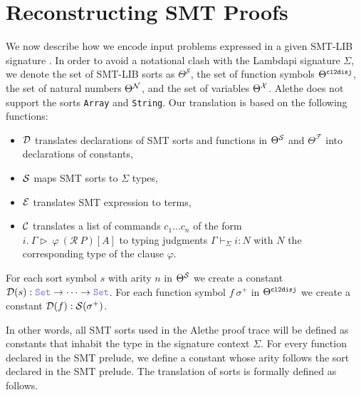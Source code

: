\chapter{Reconstructing SMT Proofs}\label{ch:reconstruction}

We now describe how we encode input problems expressed in a given
SMT-LIB signature \cite[\S 5.2.1]{smtlib}. In order to avoid a notational clash with the Lambdapi signature $\Sigma$, we denote the set of SMT-LIB sorts as $\Theta^\mathcal{S}$, the set of function symbols $\Theta^\cltodisj$, the set of natural numbers $\Theta^\cal{N}$, and the set of variables $\Theta^\cal{X}$.
Alethe does not support the sorts \texttt{Array} and \texttt{String}. Our translation is based on the following functions:
\begin{itemize}
\item $\cal{D}$ translates declarations of SMT sorts and functions in $\Theta^\cal{S}$ and $\Theta^\mathcal{F}$ into declarations of constants,
\item $\cal{S}$ maps SMT sorts to $\Sigma$ types,
\item $\cal{E}$ translates SMT expression to \lpm terms,
\item $\cal{C}$ translates a list of commands  $c_1 \dots c_n$ of the form\\
  $i.~\Gamma \triangleright~\varphi~(\mathcal{R}~P)[A]$ to typing judgments $\Gamma \vdash_\Sigma i : N$ with $N$ the corresponding type of the clause $\varphi$.
\end{itemize}

\smallskip

\begin{definition}
For each sort symbol $s$ with arity $n$ in $\Theta^\cal{S}$ we create a constant $\cal{D}(s) : \set \ra \dots \ra \set$.
For each function symbol $f~\sigma^+$ in $\Theta^\cltodisj$ we create a constant $\cal{D}(f) : \cal{S}(\sigma^+)$.
\label{def:function-d}
\end{definition}

\smallskip

In other words, all SMT sorts used in the Alethe proof trace will be defined as constants that inhabit the type \set{} in the signature context $\Sigma$.
For every function declared in the SMT prelude, we define a constant whose arity follows the sort declared in the SMT prelude. The translation of sorts is formally defined as follows.

